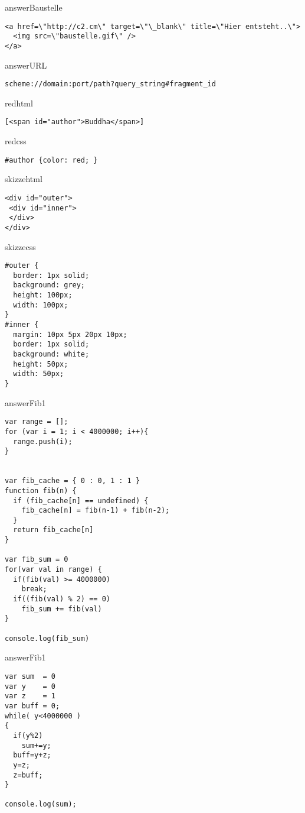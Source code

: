 \begin{chunk}{answerBaustelle}
\begin{lstlisting}[frame=single,xleftmargin=5mm, numberstyle=\tiny]
<a href=\"http://c2.cm\" target=\"\_blank\" title=\"Hier entsteht..\">
  <img src=\"baustelle.gif\" />
</a>
\end{lstlisting}
\end{chunk}

\begin{chunk}{answerURL}
\begin{lstlisting}[frame=single,xleftmargin=5mm, numberstyle=\tiny]
scheme://domain:port/path?query_string#fragment_id
\end{lstlisting}
\end{chunk}

\begin{chunk}{redhtml}
\begin{lstlisting}[frame=single,xleftmargin=5mm, numberstyle=\tiny]
[<span id="author">Buddha</span>]
\end{lstlisting}
\end{chunk}

\begin{chunk}{redcss}
\begin{lstlisting}[frame=single,xleftmargin=5mm, numberstyle=\tiny]
#author {color: red; }
\end{lstlisting}
\end{chunk}

\begin{chunk}{skizzehtml}
\begin{lstlisting}[frame=single,xleftmargin=5mm, numberstyle=\tiny]
<div id="outer">
 <div id="inner">
 </div>
</div>
\end{lstlisting}
\end{chunk}

\begin{chunk}{skizzecss}
\begin{lstlisting}[frame=single,xleftmargin=5mm, numberstyle=\tiny]
#outer {
  border: 1px solid;
  background: grey;
  height: 100px;
  width: 100px;
}
#inner {
  margin: 10px 5px 20px 10px;
  border: 1px solid;
  background: white;
  height: 50px;
  width: 50px;
}
\end{lstlisting}
\end{chunk}


\begin{chunk}{answerFib1}
\begin{lstlisting}[frame=single,xleftmargin=5mm, numberstyle=\tiny]
var range = [];
for (var i = 1; i < 4000000; i++){
  range.push(i);
}


var fib_cache = { 0 : 0, 1 : 1 }
function fib(n) {
  if (fib_cache[n] == undefined) {
    fib_cache[n] = fib(n-1) + fib(n-2);
  }
  return fib_cache[n]
}

var fib_sum = 0
for(var val in range) {
  if(fib(val) >= 4000000)
    break;
  if((fib(val) % 2) == 0)
    fib_sum += fib(val)
}

console.log(fib_sum)
\end{lstlisting}
\end{chunk}

\begin{chunk}{answerFib1}
\begin{lstlisting}[frame=single,xleftmargin=5mm, numberstyle=\tiny]
var sum  = 0
var y    = 0
var z    = 1
var buff = 0;
while( y<4000000 )
{
  if(y%2)
    sum+=y;
  buff=y+z;
  y=z;
  z=buff;
}

console.log(sum);
\end{lstlisting}
\end{chunk}
